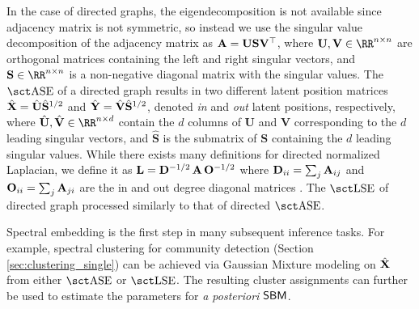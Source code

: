 In the case of directed graphs, the eigendecomposition is not available since adjacency matrix is not symmetric, so instead we use the singular value decomposition of the adjacency matrix as $\operatorname{\mathbf{A}}=\mathbf{U}\mathbf{S}\mathbf{V}^\top$, where $\mathbf{U},\mathbf{V}\in\RR^{n\times n}$ are orthogonal matrices containing the left and right singular vectors, and $\mathbf{S}\in\RR^{n\times n}$ is a non-negative diagonal matrix with the singular values. 
The $\ase$ of a directed graph results in two different latent position matrices $\hat{\operatorname{\mathbf{X}}}= \hat{\mathbf{U}}\hat{\mathbf{S}}^{1/2}$ and $\hat{\operatorname{\mathbf{Y}}}= \hat{\mathbf{V}}\hat{\mathbf{S}}^{1/2}$, denoted \textit{in} and \textit{out} latent positions, respectively, where $\hat{\mathbf{U}},\hat{\mathbf{V}}\in\RR^{n\times d}$ contain the $d$ columns of $\mathbf{U}$ and $\mathbf{V}$ corresponding to the $d$ leading singular vectors, and $\hat{\mathbf{S}}$ is the submatrix of $\mathbf{S}$ containing the $d$ leading singular values. 
While there exists many definitions for directed normalized Laplacian, we define it as $\mathbf{L} = \mathbf{D}^{-1/2}\operatorname{\mathbf{A}}\mathbf{O}^{-1/2}$ where $\mathbf{D}_{ii} =\sum_j\operatorname{\mathbf{A}}_{ij}$ and  $\mathbf{O}_{ii} =\sum_j\operatorname{\mathbf{A}}_{ji}$ are the in and out degree diagonal matrices \cite{rohe2016co}. The $\lse$ of directed graph processed similarly to that of directed $\ase$. 

Spectral embedding is the first step in many subsequent inference tasks. For example, spectral clustering for community detection (Section \ref{sec:clustering_single}) can be achieved via Gaussian Mixture modeling on $\hat {\operatorname{\mathbf{X}}}$ from either $\ase$ or $\lse$. The resulting cluster assignments can further be used to estimate the parameters for \textit{a posteriori} $\operatorname{\mathsf{SBM}}$. 

